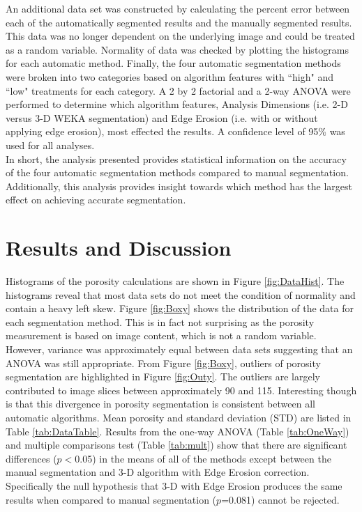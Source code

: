 \documentclass[11pt, twocolumn]{IEEEtran}
\begin{document}
An additional data set was constructed by calculating the percent error between each of the automatically segmented results and the manually segmented results. This data was no longer dependent on the underlying image and could be treated as a random variable. Normality of data was checked by plotting the histograms for each automatic method. Finally, the four automatic segmentation methods  were broken into two categories based on algorithm features with ``high" and ``low" treatments for each category. A 2 by 2 factorial and a 2-way ANOVA were performed to determine which algorithm features, Analysis Dimensions (i.e. 2-D versus 3-D WEKA segmentation) and Edge Erosion (i.e. with or without applying edge erosion), most effected the results. A confidence level of 95\% was used for all analyses.\\
In short, the analysis presented provides statistical information on the accuracy of the four automatic segmentation methods compared to manual segmentation. Additionally, this analysis provides insight towards which method has the largest effect on achieving accurate segmentation.

\section{Results and Discussion} \label{RandD}
Histograms of the porosity calculations are shown in Figure \ref{fig:DataHist}. The histograms reveal that most data sets do not meet the condition of normality and contain a heavy left skew. Figure \ref{fig:Boxy} shows the distribution of the data for each segmentation method. This is in fact not surprising as the porosity measurement is based on image content, which is not a random variable. However, variance was approximately equal between data sets suggesting that an ANOVA was still appropriate. From Figure \ref{fig:Boxy}, outliers of porosity segmentation are highlighted in Figure \ref{fig:Outy}. The outliers are largely contributed to image slices between approximately 90 and 115. Interesting though is that this divergence in porosity segmentation is consistent between all automatic algorithms. Mean porosity and standard deviation (STD) are listed in Table \ref{tab:DataTable}. Results from the one-way ANOVA (Table \ref{tab:OneWay}) and multiple comparisons test (Table \ref{tab:mult}) show that there are significant differences ($p<$0.05) in the means of all of the methods except between the manual segmentation and 3-D algorithm with Edge Erosion correction. Specifically the null hypothesis that 3-D with Edge Erosion produces the same results when compared to manual segmentation ($p$=0.081) cannot be rejected.
\end{document}
